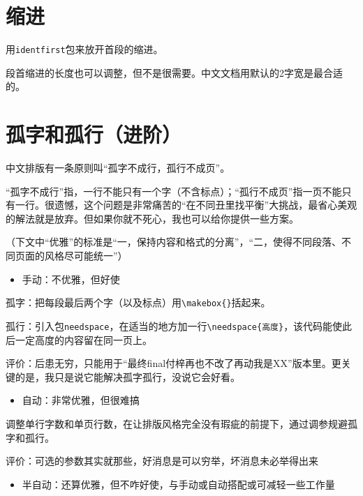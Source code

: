 \documentclass[10pt,openany]{book}
\newenvironment{tightitem}
{\begin{itemize}[topsep=0pt,partopsep=0pt,itemsep=0pt,parsep=0pt,leftmargin=3\ccwd,labelwidth=1.5\ccwd,labelsep=.5\ccwd]}
        {\end{itemize}}
\begin{document}


\section{缩进}

用\texttt{identfirst}包来放开首段的缩进。



段首缩进的长度也可以调整，但不是很需要。中文文档用默认的2字宽是最合适的。



\section{孤字和孤行（进阶）}

中文排版有一条原则叫“孤字不成行，孤行不成页”。

“孤字不成行”指，一行不能只有一个字（不含标点）；“孤行不成页”指一页不能只有一行。很遗憾，这个问题是非常痛苦的“在不同丑里找平衡”大挑战，最省心美观的解法就是放弃。但如果你就不死心，我也可以给你提供一些方案。

（下文中“优雅”的标准是“一，保持内容和格式的分离”，“二，使得不同段落、不同页面的风格尽可能统一”）

\begin{tightitem}
    \item   手动：不优雅，但好使
\end{tightitem}

孤字：把每段最后两个字（以及标点）用\texttt{\textbackslash{}makebox\{\}}括起来。

孤行：引入包\texttt{needspace}，在适当的地方加一行\texttt{\textbackslash{}needspace\{高度\}}，该代码能使此后一定高度的内容留在同一页上。

评价：后患无穷，只能用于“最终final付梓再也不改了再动我是XX”版本里。更关键的是，我只是说它能解决孤字孤行，没说它会好看。

\begin{tightitem}
    \item   自动：非常优雅，但很难搞
\end{tightitem}

调整单行字数和单页行数，在让排版风格完全没有瑕疵的前提下，通过调参规避孤字和孤行。

评价：可选的参数其实就那些，好消息是可以穷举，坏消息未必举得出来

\begin{tightitem}
    \item   半自动：还算优雅，但不咋好使，与手动或自动搭配或可减轻一些工作量
\end{tightitem}
\end{document}
